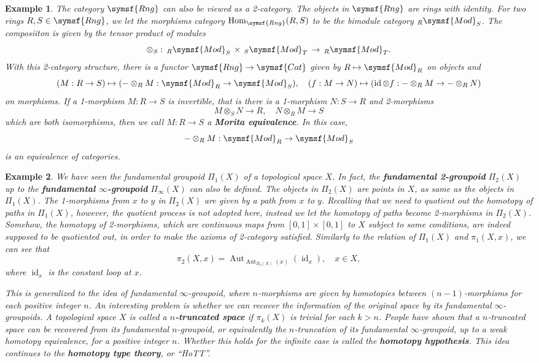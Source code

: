 \documentclass{article}
\theoremstyle{theorem}
\newtheorem{example}{Example}[section]
\theoremstyle{remark}
\DeclareMathOperator{\Hom}{Hom}
\DeclareMathOperator{\Aut}{Aut}
\DeclareMathOperator{\id}{id}
\begin{document}
\begin{example}
    The category $\symsf{Rng}$ can also be viewed as a 2-category. The objects in $\symsf{Rng}$ are rings with identity. For two rings $R, S \in \symsf{Rng}$, we let the morphisms category $\Hom_{\symsf{Rng}}(R, S)$ to be the bimodule category $_R\symsf{Mod}_S$. The composiiton is given by the tensor product of modules $$\otimes_S : \,_R\symsf{Mod}_S \,\times\, _S\symsf{Mod}_T \,\to\, _R\symsf{Mod}_T.$$ With this 2-category structure, there is a functor $\symsf{Rng} \to \symsf{Cat}$ given by $R \mapsto \symsf{Mod}_R$ on objects and $$(M : R \to S) \mapsto (- \otimes_R M : \symsf{Mod}_R \to \symsf{Mod}_S), \quad (f : M \to N) \mapsto (\id \otimes f : - \otimes_R M \to - \otimes_R N)$$ on morphisms. If a 1-morphism $M : R \to S$ is invertible, that is there is a 1-morphism $N : S \to R$ and 2-morphisms $$M \otimes_S N \to R, \quad N \otimes_R M \to S$$ which are both isomorphisms, then we call $M : R \to S$ a \textbf{Morita equivalence}. In this case, $$- \otimes_R M : \symsf{Mod}_R \to \symsf{Mod}_S$$ is an equivalence of categories. 
\end{example}

\begin{example}
    We have seen the fundamental groupoid $\Pi_1(X)$ of a topological space $X$. In fact, the \textbf{fundamental 2-groupoid} $\Pi_2(X)$ up to the \textbf{fundamental $\infty$-groupoid} $\Pi_\infty(X)$ can also be defined. The objects in $\Pi_2(X)$ are points in $X$, as same as the objects in $\Pi_1(X)$. The 1-morphisms from $x$ to $y$ in $\Pi_2(X)$ are given by a path from $x$ to $y$. Recalling that we need to quotient out the homotopy of paths in $\Pi_1(X)$, however, the quotient process is not adopted here, instead we let the homotopy of paths become 2-morphisms in $\Pi_2(X)$. Somehow, the homotopy of 2-morphisms, which are continuous maps from $[0,1] \times [0,1]$ to $X$ subject to some conditions, are indeed supposed to be quotiented out, in order to make the axioms of 2-category satisfied. Similarly to the relation of $\Pi_1(X)$ and $\pi_1(X, x)$, we can see that $$\pi_2(X, x) = \Aut_{\Aut_{\Pi_2(X)}(x)}(\id_x), \quad x \in X,$$ where $\id_x$ is the constant loop at $x$. 
    
    This is generalized to the idea of fundamental $\infty$-groupoid, where $n$-morphisms are given by homotopies between $(n-1)$-morphisms for each positive integer $n$. An interesting problem is whether we can recover the information of the original space by its fundamental $\infty$-groupoids. A topological space $X$ is called a \textbf{$n$-truncated space} if $\pi_k(X)$ is trivial for each $k > n$. People have shown that a $n$-truncated space can be recovered from its fundamental $n$-groupoid, or equivalently the $n$-truncation of its fundamental $\infty$-groupoid, up to a weak homotopy equivalence, for a positive integer $n$. Whether this holds for the infinite case is called the \textbf{homotopy hypothesis}. This idea continues to the \textbf{homotopy type theory}, or ``HoTT''. 
\end{example}
\end{document}
